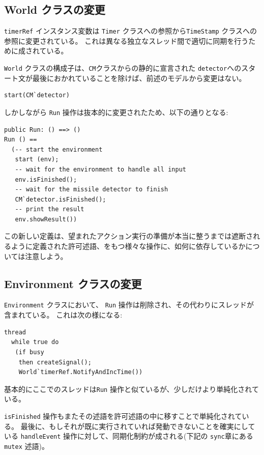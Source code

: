 \documentclass[\pformat,12pt]{jreport}
\begin{document}
\subsection{World クラスの変更}

\texttt{timerRef} インスタンス変数は \texttt{Timer} クラスへの参照から\texttt{TimeStamp} クラスへの参照に変更されている。
これは異なる独立なスレッド間で適切に同期を行うために成されている。

 \texttt{World} クラスの構成子は、\texttt{CM}クラスからの静的に宣言された \texttt{detector}へのスタート文が最後におかれていることを除けば、前述のモデルから変更はない。

\begin{lstlisting}
start(CM`detector)
\end{lstlisting}

しかしながら \texttt{Run} 操作は抜本的に変更されたため、以下の通りとなる:

\begin{lstlisting}
public Run: () ==> ()
Run () == 
  (-- start the environment
   start (env);
   -- wait for the environment to handle all input
   env.isFinished();
   -- wait for the missile detector to finish
   CM`detector.isFinished();
   -- print the result
   env.showResult())
\end{lstlisting}

この新しい定義は、望まれたアクション実行の準備が本当に整うまでは遮断されるように定義された許可述語、をもつ様々な操作に、如何に依存しているかについては注意しよう。

\subsection{Environment クラスの変更}

 \texttt{Environment} クラスにおいて、 \texttt{Run} 操作は削除され、その代わりにスレッドが含まれている。
これは次の様になる:

\begin{lstlisting}
thread
  while true do
   (if busy
    then createSignal();
    World`timerRef.NotifyAndIncTime())
\end{lstlisting}

基本的にここでのスレッドは\texttt{Run} 操作と似ているが、少しだけより単純化されている。

 \texttt{isFinished} 操作もまたその述語を許可述語の中に移すことで単純化されている。
最後に、もしそれが既に実行されていれば発動できないことを確実にしている \texttt{handleEvent} 操作に対して、同期化制約が成される(下記の \texttt{sync}章にある \texttt{mutex} 述語)。
\end{document}
